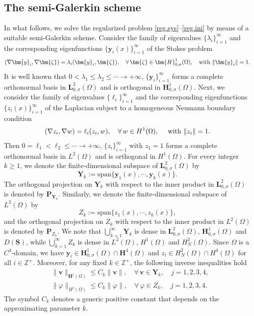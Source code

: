 \documentclass[11pt,reqno]{amsart}
\def\be{\begin{equation}}
\def\ee{\end{equation}}
\begin{document}
\subsection{The semi-Galerkin scheme}
%
In what follows, we solve the regularized problem \eqref{reg.sys}--\eqref{reg.ini} by means of a suitable semi-Galerkin scheme. Consider the family of eigenvalues $\{\lambda_i\}_{i=1}^{\infty}$ and the corresponding eigenfunctions $\{\bm{y}_{i}(x)\}_{i=1}^{\infty}$ of the Stokes problem
%
\be
(\nabla \bm{y}_{i},\nabla \bm{\zeta})=\lambda_{i}(\bm{y}_{i},\bm{\zeta}),\quad  \forall\, \bm{\zeta} \in {\bm{H}^1_{0,\sigma}(\Omega)},\quad \textrm{with}\ \|\bm{y}_{i}\|=1.
\notag
\ee
%
It is well known that $0<\lambda_1\leq \lambda_2 \leq \cdots \to +\infty$, $\{\bm{y}_{i}\}_{i=1}^{\infty}$ forms a complete orthonormal basis in $\bm{L}^2_{0,\sigma}(\Omega)$ and is orthogonal in $\bm{H}^1_{0,\sigma}(\Omega)$.
Next, we consider the family of eigenvalues $\{\ell_i\}_{i=1}^{\infty}$ and the corresponding eigenfunctions $\{z_{i}(x)\}_{i=1}^{\infty}$ of the Laplacian subject to a homogeneous Neumann boundary condition
\be
(\nabla z_{i},\nabla w)=\ell_{i}(z_{i},w),\quad  \forall\, w \in {H^1(\Omega)}, \quad \textrm{ with }  \|z_{i}\|=1.
\notag
\ee
Then $0=\ell_1<\ell_2 \leq \cdots \to +\infty$, $\{z_{i}\}_{i=1}^{\infty}$ with $z_1=1$ forms a complete orthonormal basis in $L^2(\Omega)$ and is orthogonal in $H^1(\Omega)$.
For every integer $k\geq 1$, we denote the finite-dimensional subspace of $\bm{L}^2_{0,\sigma}(\Omega)$ by
$$ \bm{Y}_{k}:=\textrm{span} \{\bm{y}_{1}(x) ,\cdots,\bm{y}_{k}(x)\}.$$
The orthogonal projection on $\bm{Y}_{k}$ with respect to the inner product in $\bm{L}^2_{0,\sigma}(\Omega)$ is denoted by $\bm{P}_{\bm{Y}_{k}}$. Similarly, we denote the finite-dimensional subspace of $L^2(\Omega)$ by
$$ Z_{k}:=\textrm{span} \{z_{1}(x) ,\cdots,z_{k}(x)\},$$
and the orthogonal projection on $Z_{k}$ with respect to the inner product in $L^2(\Omega)$ is denoted by $\bm{P}_{Z_{k}}$.
We note that $\bigcup_{k=1}^\infty \bm{Y}_{k}$ is dense in $\bm{L}^2_{0,\sigma}(\Omega)$, $\bm{H}^1_{0,\sigma}(\Omega)$ and $D(\bm{S})$, while $\bigcup_{k=1}^\infty Z_{k}$ is dense in $L^2(\Omega)$, $H^1(\Omega)$ and $H_N^2(\Omega)$.
Since $\Omega$ is a $C^4$-domain, we have $\bm{y}_{i}\in \bm{H}^1_{0,\sigma}(\Omega)\cap \bm{H}^4(\Omega)$ and $z_i\in H^2_N(\Omega)\cap H^4(\Omega)$ for all $i\in \mathbb{Z}^+$.
Moreover, for any fixed $k\in \mathbb{Z}^+$, the following inverse inequalities hold
%
\begin{align*}
&\|\bm{v}\|_{\bm{H}^j(\Omega)}\leq C_k\|\bm{v}\|,\quad \forall\, \bm{v}\in \bm{Y}_k,\quad j=1, 2, 3, 4,
\\
& \|\varphi\|_{H^j(\Omega)}\leq C_k\|\varphi\|,\quad \forall\,\varphi\in Z_k,\quad j=1, 2, 3, 4.
\end{align*}
%
The symbol $C_k$ denotes a generic positive constant that depends on the approximating parameter $k$.
\medskip
\end{document}
